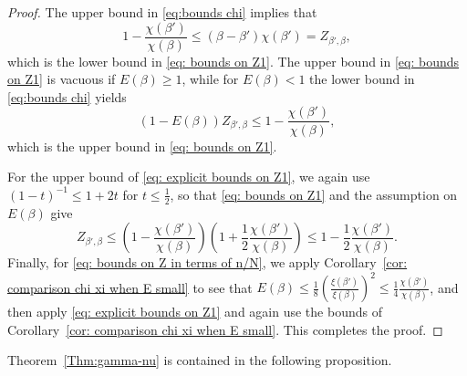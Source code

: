\documentclass[11pt,a4paper]{article}
\numberwithin{equation}{section}
\theoremstyle{plain}
\theoremstyle{definition}
\newcommand\1{\mathds{1}}
\begin{document}
 \begin{proof} The upper bound in \eqref{eq:bounds chi} implies that
 \begin{equation}
 	1-\frac{\chi(\beta')}{\chi(\beta)}\leq (\beta-\beta')\chi(\beta')=Z_{\beta',\beta},
 \end{equation}
 which is the lower bound in \eqref{eq: bounds on Z1}.
 The upper bound in \eqref{eq: bounds on Z1} is vacuous if $E(\beta)\geq 1$,
  while for $E(\beta)<1$ the lower bound in \eqref{eq:bounds chi} yields
 \begin{equation}
 	(1-E(\beta))Z_{\beta',\beta}
    \leq 1-\frac{\chi(\beta')}{\chi(\beta)},
 \end{equation}
which is the upper bound in \eqref{eq: bounds on Z1}.

For the upper bound of \eqref{eq: explicit bounds on Z1},
we again use $(1-t)^{-1}\leq 1+2t$ for $t\leq \tfrac{1}{2}$,
so that \eqref{eq: bounds on Z1} and the assumption on $E(\beta)$ give
 \begin{equation}
 	Z_{\beta',\beta}\leq \left(1-\frac{\chi(\beta')}{\chi(\beta)}\right)\left(1+\frac{1}{2}\frac{\chi(\beta')}{\chi(\beta)}\right)\leq 1-\frac{1}{2}\frac{\chi(\beta')}{\chi(\beta)}.
 \end{equation}
Finally, for \eqref{eq: bounds on Z in terms of n/N}, we
apply Corollary~\ref{cor: comparison chi xi when E small} to see that
$E(\beta) \le \frac 18 (\frac{\xi(\beta')}{\xi(\beta)})^2 \leq \frac 14 \frac{\chi(\beta')}{\chi(\beta)}$, and then apply
\eqref{eq: explicit bounds on Z1} and again use the bounds
of Corollary~\ref{cor: comparison chi xi when E small}. This completes the proof.
\end{proof}






Theorem~\ref{Thm:gamma-nu} is contained in the following proposition.
\end{document}
